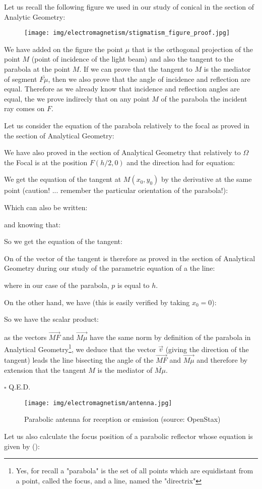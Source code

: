 Let us recall the following figure we used in our study of conical in the section of Analytic Geometry:
	\begin{figure}[H]
		\centering
		\texttt{[image: img/electromagnetism/stigmatism\_figure\_proof.jpg]}
	\end{figure}
	We have added on the figure the point $\mu$ that is the orthogonal projection of the point $M$ (point of incidence of the light beam) and also the tangent to the parabola at the point $M$. If we can prove that the tangent to $M$ is the mediator of segment $\overline{F\mu}$, then we also prove that the angle of incidence and reflection are equal. Therefore as we already know that incidence and reflection angles are equal, the we prove indirecly that on any point $M$ of the parabola the incident ray comes on $F$.
	\begin{dem}
	Let us consider the equation of the parabola relatively to the focal as proved in the section of Analytical Geometry:
	
	We have also proved in the section of Analytical Geometry that relatively to $\Omega$ the Focal is at the position $F(h/2,0)$ and the direction had for equation:
	
	We get the equation of the tangent at $M(x_0,y_0)$ by the derivative at the same point (caution! ... remember the particular orientation of the parabola!):
	
	Which can also be written:
	
	and knowing that:
	
	So we get the equation of the tangent:
	
	On of the vector of the tangent is therefore as proved in the section of Analytical Geometry during our study of the parametric equation of a the line:
	
	where in our case of the parabola, $p$ is equal to $h$.
	
	On the other hand, we have (this is easily verified by taking $x_0=0$):
	
	So we have the scalar product:
	
	as the vectors $\overrightarrow{MF}$ and $\overrightarrow{M\mu}$ have the same norm by definition of the parabola in Analytical Geometry\footnote{Yes, for recall a "parabola" is the set of all points which are equidistant from a point, called the focus, and a line, named the "directrix"}, we deduce that the vector $\vec{v}$ (giving the direction of the tangent) leads the line bisecting the angle of the $\overrightarrow{MF}$ and $\overrightarrow{M\mu}$ and therefore by extension that the tangent $M$ is the mediator of $\overline{M\mu}$.
	\begin{flushright}
		$\square$  Q.E.D.
	\end{flushright}
	\end{dem} 
	\begin{figure}[H]
		\centering
		\texttt{[image: img/electromagnetism/antenna.jpg]}	
		\caption[Parabolic antenna for reception or emission]{Parabolic antenna for reception or emission (source: OpenStax)}
	\end{figure}
	Let us also calculate the focus position of a parabolic reflector whose equation is given by ():
	
